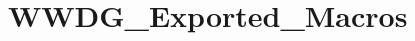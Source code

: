 \hypertarget{group__WWDG__Exported__Macros}{
\section{WWDG\_\-Exported\_\-Macros}
\label{group__WWDG__Exported__Macros}
}
